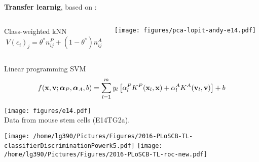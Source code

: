 \begin{frame}
  \textbf{Transfer learnig}, based on \cite{Wu:2004}:
  \begin{columns}[t]
    \begin{column}[T]{0.5\textwidth}            
      \begin{block}{Class-weighted kNN}      
        \begin{equation*}
          \label{eq:translearn}
          V(c_i)_j = \theta^* n_{ij}^{P} + (1 - \theta^*) n_{ij}^{A}
        \end{equation*}
      \end{block}
    \end{column}
    \begin{column}[T]{0.4\textwidth} 
      \texttt{[image: figures/pca-lopit-andy-e14.pdf]} \\
    \end{column}    
  \end{columns}
  \begin{block}{Linear programming SVM}
    \begin{equation*}\label{eq:translearn2}
      f(\mathbf{x}, \mathbf{v}; \bm{\alpha}_P, \bm{\alpha}_A, b) = \sum_{l=1}^m y_l \left[ \alpha_l^P
        K^P(\mathbf{x}_l, \mathbf{x}) + \alpha_l^A K^A(\mathbf{v}_l, \mathbf{v}) \right] + b
    \end{equation*}
  \end{block}
\end{frame}


% 



\begin{frame}
  \texttt{[image: figures/e14.pdf]}
  \\
  \scriptsize
  Data from mouse stem cells (E14TG2a).
\end{frame}


\begin{frame}{}
  \texttt{[image: /home/lg390/Pictures/Figures/2016-PLoSCB-TL-classifierDiscriminationPowerk5.pdf]}
  \texttt{[image: /home/lg390/Pictures/Figures/2016-PLoSCB-TL-roc-new.pdf]}
\end{frame}

